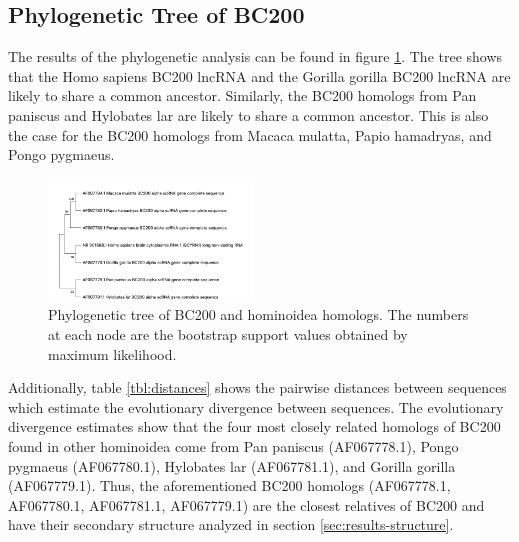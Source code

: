 \documentclass[conference, 11pt]{IEEEtran}
\begin{document}

\subsection{Phylogenetic Tree of BC200}

The results of the phylogenetic analysis can be found in figure \ref{fig:phylo-tree}. 
The tree shows that the Homo sapiens BC200 lncRNA and the Gorilla gorilla BC200 lncRNA are likely to share a common ancestor. 
Similarly, the BC200 homologs from Pan paniscus and Hylobates lar are likely to share a common ancestor. 
This is also the case for the BC200 homologs from Macaca mulatta, Papio hamadryas, and Pongo pygmaeus. 

\begin{figure}[ht]
  \centering
  \includegraphics[width=0.485\textwidth]{figs/phylogenetic-tree.jpg}
  \caption{Phylogenetic tree of BC200 and hominoidea homologs. The numbers at each node are the bootstrap support values obtained by maximum likelihood.}
  \label{fig:phylo-tree}
\end{figure}

Additionally, table \ref{tbl:distances} shows the pairwise distances between sequences which estimate the evolutionary divergence between sequences. 
The evolutionary divergence estimates show that the four most closely related homologs of BC200 found in other hominoidea come from Pan paniscus (AF067778.1), Pongo pygmaeus (AF067780.1), Hylobates lar (AF067781.1), and Gorilla gorilla (AF067779.1). 
Thus, the aforementioned BC200 homologs (AF067778.1, AF067780.1, AF067781.1, AF067779.1) are the closest relatives of BC200 and have their secondary structure analyzed in section \ref{sec:results-structure}.
\end{document}
